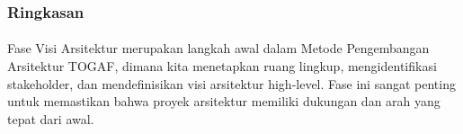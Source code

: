 \documentclass[aspectratio=169, table]{beamer}
\begin{document}
	\begin{frame}
		\frametitle{Ringkasan}
		\framesubtitle{\hspace{1cm}}
		Fase Visi Arsitektur merupakan langkah awal dalam Metode Pengembangan Arsitektur TOGAF, dimana kita menetapkan ruang lingkup, mengidentifikasi stakeholder, dan mendefinisikan visi arsitektur high-level. Fase ini sangat penting untuk memastikan bahwa proyek arsitektur memiliki dukungan dan arah yang tepat dari awal.
	\end{frame}
	
\end{document}
